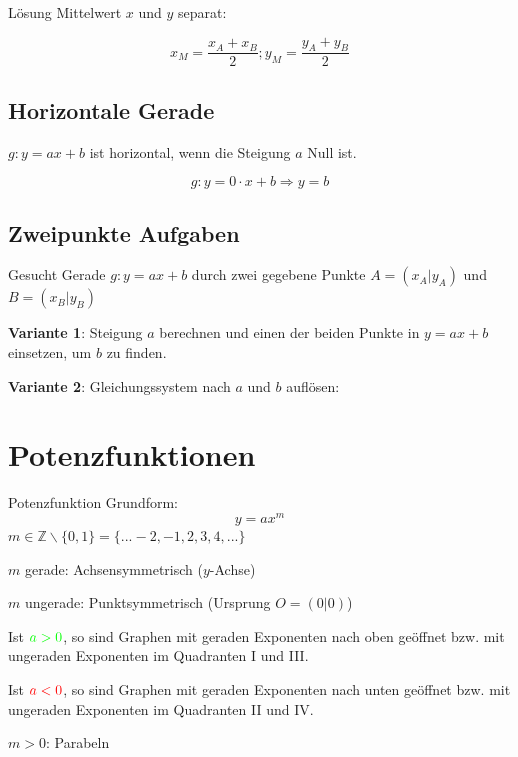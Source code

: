 \begin{multicols}{2}
Lösung Mittelwert $x$ und $y$ separat:

$$x_M = \frac{x_A+x_B}2; y_M=\frac{y_A+y_B}2$$

\subsection*{Horizontale Gerade}

$g: y=ax+b$ ist horizontal, wenn die Steigung $a$ Null ist.

$$g:  y=0\cdot{}x+b \Rightarrow y=b$$

\subsection*{Zweipunkte Aufgaben}
Gesucht Gerade $g: y=ax+b$ durch zwei gegebene Punkte $A=(x_A|y_A)$
und $B=(x_B|y_B)$

\textbf{Variante 1}: Steigung $a$ berechnen und einen der beiden Punkte in
$y=ax+b$ einsetzen, um $b$ zu finden.

\textbf{Variante 2}: Gleichungssystem nach $a$ und $b$ auf\/lösen:



\forceCB

\section*{Potenzfunktionen}

\begin{definition*}{Potenzfunktion}{}
Grundform:
$$y=ax^m$$
$m\in\mathbb{Z}\backslash\{0,1\} = \{...-2, -1, 2, 3, 4, ...\}$
\end{definition*}


$m$ gerade: Achsensymmetrisch ($y$-Achse)

$m$ ungerade: Punktsymmetrisch (Ursprung $O=(0|0)$)

Ist ${\color{green}a>0}$, so sind Graphen mit
geraden Exponenten nach oben geöffnet bzw. mit ungeraden Exponenten im
Quadranten I und III.

Ist ${\color{red}a<0}$, so sind Graphen mit
geraden Exponenten nach unten geöffnet bzw. mit ungeraden Exponenten
im Quadranten II und IV.


$m>0$: Parabeln


\end{multicols}
